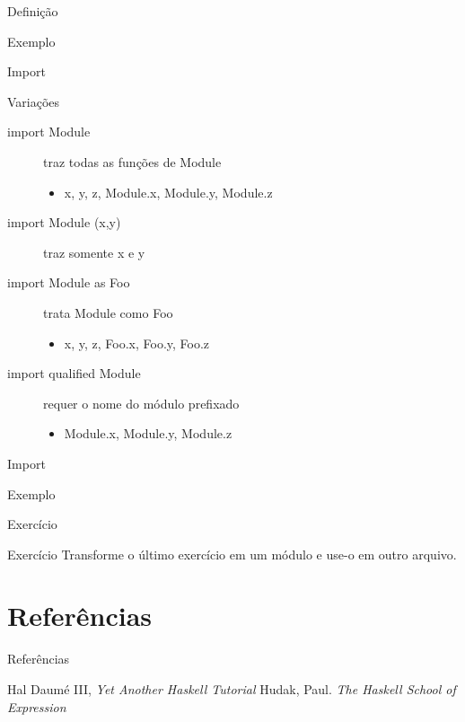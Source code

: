 \documentclass{beamer}
\begin{document}
			\begin{frame}[fragile]{Definição}
			 \begin{block}{Exemplo}
			  
			 \end{block}
			\end{frame}
			
			\begin{frame}[fragile]{Import}
			 \begin{block}{Variações}
			  \begin{description}
			   \item [import Module] traz todas as funções de Module
					\begin{itemize}
					 \item x, y, z, Module.x, Module.y, Module.z
					\end{itemize}
				 \item [import Module (x,y)] traz somente x e y
				 \item [import Module as Foo] trata Module como Foo
					\begin{itemize}
					 \item x, y, z, Foo.x, Foo.y, Foo.z
					\end{itemize}

			   \item [import qualified Module] requer o nome do módulo prefixado
					\begin{itemize}
					 \item Module.x, Module.y, Module.z
					\end{itemize}
			  \end{description}			  
			 \end{block}
			\end{frame}
			
			\begin{frame}[fragile]{Import}
			 \begin{block}{Exemplo}
			  
			 \end{block}
			\end{frame}
			
			\begin{frame}{Exercício}
			 \begin{block}{Exercício}
			  Transforme o último exercício em um módulo e use-o em outro arquivo.
			 \end{block}
			\end{frame}

			
\section{Referências}
\begin{frame}{Referências}
	\begin{thebibliography}{9}
	 Hal Daumé III, \textit{Yet Another Haskell Tutorial}
	 Hudak, Paul. \textit{The Haskell School of Expression}
	\end{thebibliography}
\end{frame}
	
	
\end{document}
